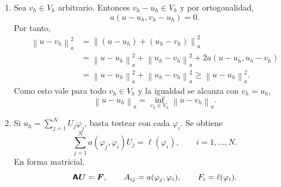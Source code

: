 \documentclass[11pt]{article}
\newcommand{\norm}[1]{\left\lVert #1\right\rVert}
\def\mat   #1{\mbox{\boldmath $\mathsf #1$}}
\def\vec   #1{\mbox{\boldmath $#1$}{}}
\begin{document}
\begin{enumerate}[label=\textbf{\arabic*.}, leftmargin=*]
\begin{enumerate}[label=(\alph*)]
        \item Sea $v_h\in V_h$ arbitrario. Entonces $v_h-u_h\in V_h$ y por ortogonalidad,
        \[
            a(u-u_h,v_h-u_h)=0.
        \]
        Por tanto,
        \begin{align*}
            \norm{u-v_h}_a^2
            &=
            \norm{(u-u_h)+(u_h-v_h)}_a^2\\
            &=
            \norm{u-u_h}_a^2+\norm{u_h-v_h}_a^2
            +2a(u-u_h,u_h-v_h)\\
            &=
            \norm{u-u_h}_a^2+\norm{u_h-v_h}_a^2
            \ge
            \norm{u-u_h}_a^2.
        \end{align*}
        Como esto vale para todo $v_h\in V_h$ y la igualdad se alcanza con $v_h=u_h$,
        \[
            \norm{u-u_h}_a=\inf_{v_h\in V_h}\norm{u-v_h}_a.
        \]

        \item Si $u_h=\sum_{j=1}^N U_j\varphi_j$, basta testear con cada $\varphi_i$. Se obtiene
        \[
            \sum_{j=1}^N a(\varphi_j,\varphi_i)U_j=\ell(\varphi_i),
            \qquad i=1,\dots,N.
        \]
        En forma matricial,
        \[
            \mat A\vec U=\vec F,
            \qquad
            A_{ij}=a(\varphi_j,\varphi_i),
            \qquad
            F_i=\ell(\varphi_i).
        \]
    \end{enumerate}

\end{enumerate}
\end{document}
